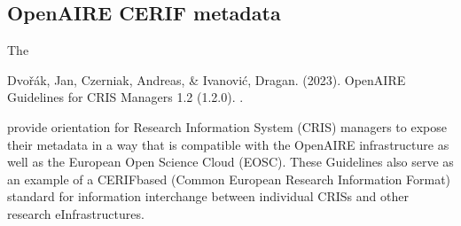 \documentclass[a4paper,10pt,english]{sphinxmanual}
\begin{document}
\subsection{OpenAIRE CERIF metadata}
\label{\detokenize{white-paper/linking-datasets:openaire-cerif-metadata}}
\sphinxAtStartPar
The  %
\begin{footnote}[6]\sphinxAtStartFootnote
Dvořák, Jan, Czerniak, Andreas, \& Ivanović, Dragan. (2023). OpenAIRE
Guidelines for CRIS Managers 1.2 (1.2.0). .
%
\end{footnote}
provide orientation for Research Information System (CRIS) managers to
expose their metadata in a way that is compatible with the OpenAIRE
infrastructure as well as the European Open Science Cloud (EOSC).
These Guidelines also serve as an example of a CERIF\sphinxhyphen{}based (Common
European Research Information Format) standard for information
interchange between individual CRISs and other research
e\sphinxhyphen{}Infrastructures.
\end{document}
